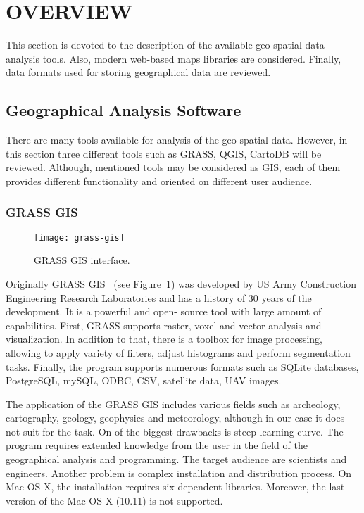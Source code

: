 \section{OVERVIEW}

This section is devoted to the description of the available geo-spatial data analysis tools. Also,
modern web-based maps libraries are considered. Finally, data formats used for storing geographical
data are reviewed.

\subsection{Geographical Analysis Software}

There are many tools available for analysis of the geo-spatial data. However, in this section
three different tools such as GRASS, QGIS, CartoDB will be reviewed. Although, mentioned
tools may be considered as GIS, each of them provides different functionality and oriented
on different user audience.

\subsubsection{GRASS GIS}

\begin{figure}[ht]
  {\par\centering
  \texttt{[image: grass-gis]}
  \par}
  \caption{GRASS GIS interface.}
  \label{pic:grass}
\end{figure}

Originally GRASS GIS~\cite{grassgis} (see Figure~\ref{pic:grass}) was developed by US Army Construction Engineering
Research Laboratories and has a history of 30 years of the development. It is a powerful  and open-
source tool with large amount of capabilities. First, GRASS supports raster, voxel and vector
analysis and visualization. In addition to that, there is a toolbox for image processing, allowing
to apply variety of filters, adjust histograms and perform segmentation tasks. Finally, the program
supports numerous formats such as SQLite databases, PostgreSQL, mySQL, ODBC, CSV, satellite data,
UAV images.

The application of the GRASS GIS includes various fields such as archeology, cartography, geology,
geophysics and meteorology, although in our case it does not suit for the task. On of the  biggest
drawbacks is steep learning curve. The program requires extended knowledge from  the user in the
field of the geographical analysis and programming. The target audience are scientists and
engineers. Another  problem is complex installation and distribution process. On Mac OS X, the
installation  requires six dependent libraries. Moreover, the last version of the Mac OS X (10.11)
is not  supported.


